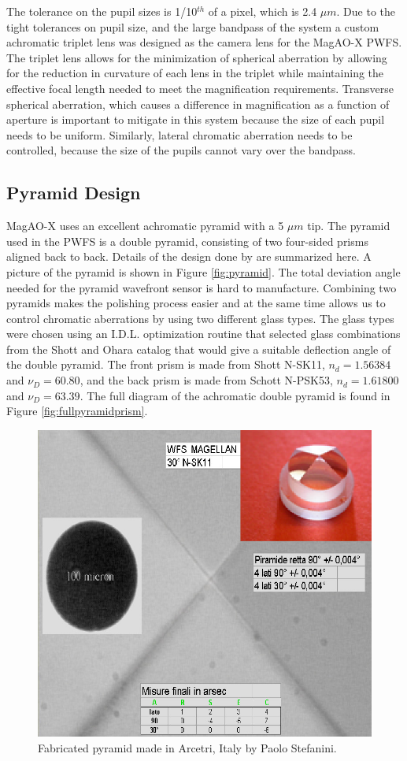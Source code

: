 The tolerance on the pupil sizes is 1/10$^{th}$ of a pixel, which is 2.4 $\mu m$. Due to the tight tolerances on pupil size, and the large bandpass of the system a custom achromatic triplet lens was designed as the camera lens for the MagAO-X PWFS. The triplet lens allows for the minimization of spherical aberration by allowing for the reduction in curvature of each lens in the triplet while maintaining the effective focal length needed to meet the magnification requirements. Transverse spherical aberration, which causes a difference in magnification as a function of aperture is important to mitigate in this system because the size of each pupil needs to be uniform. Similarly, lateral chromatic aberration needs to be controlled, because the size of the pupils cannot vary over the bandpass.
	
	
\subsection{Pyramid Design}
MagAO-X uses an excellent achromatic pyramid with a 5 $\mu m$ tip. The pyramid used in the PWFS is a double pyramid, consisting of two four-sided prisms aligned back to back. Details of the design done by \cite{tozzi2008double} are summarized here. A picture of the pyramid is shown in Figure \ref{fig:pyramid}. The total deviation angle needed for the pyramid wavefront sensor is hard to manufacture. Combining two pyramids makes the polishing process easier and at the same time allows us to control chromatic aberrations by using two different glass types. The glass types were chosen using an I.D.L. optimization routine that selected glass combinations from the Shott and Ohara catalog that would give a suitable deflection angle of the double pyramid. The front prism is made from Shott N-SK11, $n_d=1.56384$ and $\nu_D=60.80$, and the back prism is made from Schott N-PSK53, $n_d=1.61800$ and $\nu_D=63.39$. The full diagram of the achromatic double pyramid is found in Figure \ref{fig:fullpyramidprism}.




	
\begin{figure}[h]
	\centering
	\includegraphics[width=.5\textwidth]{Chapter Materials/Chapter Three Materials/pyramidGlass.png}
	\caption{Fabricated pyramid made in Arcetri, Italy by Paolo Stefanini.}
	\label{fig:pyramidprism}
\end{figure}
	
